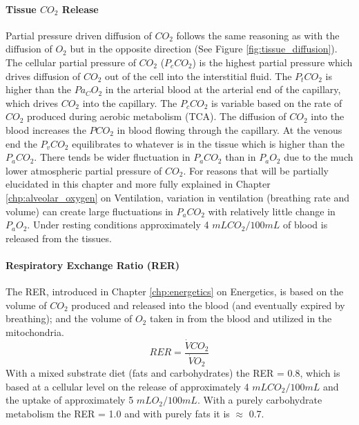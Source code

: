 \paragraph{Tissue $CO_2$ Release}
Partial pressure driven diffusion of $CO_2$ follows the same reasoning as with the diffusion of $O_2$ but in the opposite direction (See Figure \ref{fig:tissue_diffusion}). The cellular partial pressure of $CO_2$ ($P_cCO_2$) is the highest partial pressure which drives diffusion of $CO_2$ out of the cell into the interstitial fluid. The $P_tCO_2$ is higher than the $Pa_CO_2$ in the arterial blood at the arterial end of the capillary, which drives $CO_2$ into the capillary. The $P_cCO_2$ is variable based on the rate of $CO_2$ produced during aerobic metabolism (TCA). The diffusion of $CO_2$ into the blood increases the $PCO_2$ in blood flowing through the capillary. At the venous end the $P_vCO_2$ equilibrates to whatever is in the tissue which is higher than the $P_aCO_2$. There tends be wider fluctuation in $P_aCO_2$ than in $P_aO_2$ due to the much lower atmospheric partial pressure of $CO_2$. For reasons that will be partially elucidated in this chapter and more fully explained in Chapter \ref{chp:alveolar_oxygen} on Ventilation, variation in ventilation (breathing rate and volume) can create large fluctuations in $P_aCO_2$ with relatively little change in $P_aO_2$. Under resting conditions approximately 4 $mL CO_2 / 100 mL$ of blood is released from the tissues. 

\paragraph{Respiratory Exchange Ratio (RER)}

The RER, introduced in Chapter \ref{chp:energetics} on Energetics, is based on the volume of $CO_2$ produced and released into the blood (and eventually expired by breathing); and the volume of $O_2$ taken in from the blood and utilized in the mitochondria. 
\begin{equation}
    RER = \frac{\dot{V}CO_2}{\dot{V}O_2}
\end{equation}
With a mixed substrate diet (fats and carbohydrates) the RER = 0.8, which is based at a cellular level on the release of approximately 4 $mL CO_2 / 100 mL$ and the uptake of approximately 5 $mL O_2 / 100 mL$. With a purely carbohydrate metabolism the RER = 1.0 and with purely fats it is $\approx$ 0.7. 



